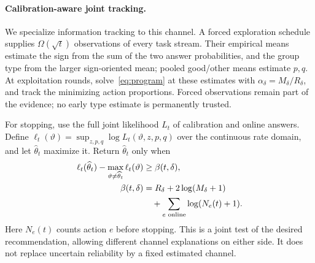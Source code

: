\documentclass[sigconf,anonymous,review]{acmart}
\begin{document}
\paragraph{Calibration-aware joint tracking.}
We specialize information tracking to this channel. A forced exploration schedule supplies $\Omega(\sqrt t)$ observations of every task stream. Their empirical means estimate the sign from the sum of the two answer probabilities, and the group type from the larger sign-oriented mean; pooled good/other means estimate $p,q$. At exploitation rounds, solve~\eqref{eq:program} at these estimates with $\alpha_\delta=M_\delta/R_\delta$, and track the minimizing action proportions. Forced observations remain part of the evidence; no early type estimate is permanently trusted.

For stopping, use the full joint likelihood $L_t$ of calibration and online answers. Define $\ell_t(\vartheta)=\sup_{z,p,q}\log L_t(\vartheta,z,p,q)$ over the continuous rate domain, and let $\widehat\theta_t$ maximize it. Return $\widehat\theta_t$ only when
\begin{align}\label{eq:stop}
 \ell_t(\widehat\theta_t)-\max_{\vartheta\ne\widehat\theta_t}\ell_t(\vartheta)&\ge\beta(t,\delta),\\
 \beta(t,\delta)&=R_\delta+2\log(M_\delta+1)\notag\\
 &\quad+\sum_{e\text{ online}}\log(N_e(t)+1).\notag
\end{align}
Here $N_e(t)$ counts action $e$ before stopping. This is a joint test of the desired recommendation, allowing different channel explanations on either side. It does not replace uncertain reliability by a fixed estimated channel.
\end{document}
